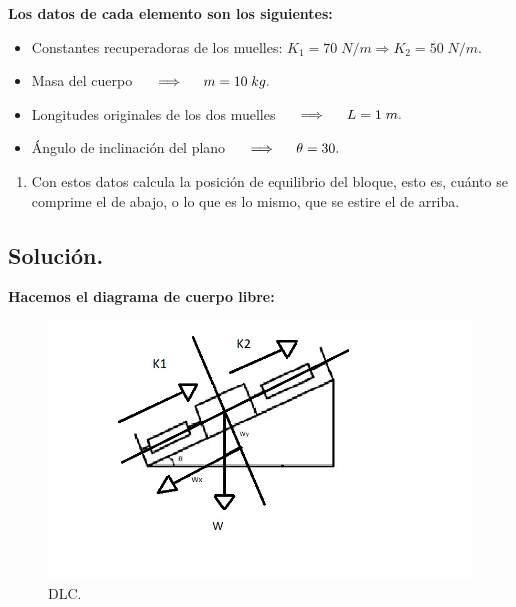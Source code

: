 \documentclass[a4paper,12pt]{article} %
\begin{document}
\begin{justify}
    \textbf{Los datos de cada elemento son los siguientes:}
\end{justify}

\begin{itemize}
    \item Constantes recuperadoras de los muelles: \(K_1 = 70 \; N/m \Longrightarrow K_2 = 50 \; N/m.\)
    \item Masa del cuerpo \(\hspace{0.5 cm} \Longrightarrow \hspace{0.5 cm} m = 10 \; kg.\)
    \item Longitudes originales de los dos muelles \(\hspace{0.5 cm} \Longrightarrow \hspace{0.5 cm} L = 1 \; m.\)
    \item Ángulo de inclinación del plano \(\hspace{0.5 cm} \Longrightarrow \hspace{0.5 cm} \theta = 30. \)
\end{itemize}

\vspace{\baselineskip}

\begin{enumerate}
    \item Con estos datos calcula la posición de equilibrio del bloque, esto es, cuánto se comprime el de abajo, o lo que es lo mismo, que se estire el de arriba.
\end{enumerate}

\subsection*{Solución.}

\begin{justify}
    \textbf{Hacemos el diagrama de cuerpo libre:}
\end{justify}

\begin{figure}[H]
    \centering
    \includegraphics[width=\textwidth]{Diagrama de cuerpo libre.jpg}
    \caption{DLC. }
\end{figure}
\end{document}
